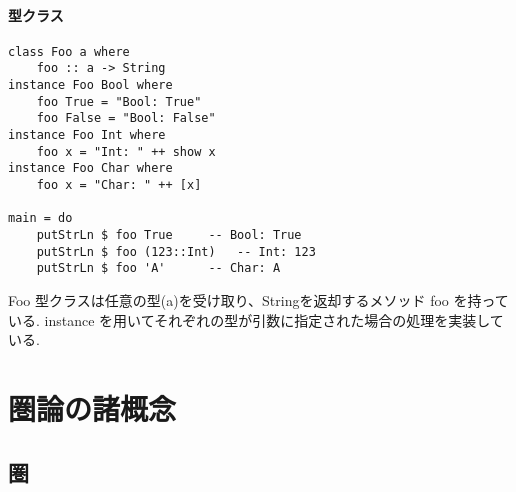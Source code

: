 \documentclass[dvipdfmx]{jsbook}
\theoremstyle{plain}
\begin{document}
\subsection{型クラス}
\begin{lstlisting}
class Foo a where
    foo :: a -> String
instance Foo Bool where
    foo True = "Bool: True"
    foo False = "Bool: False"
instance Foo Int where
    foo x = "Int: " ++ show x
instance Foo Char where
    foo x = "Char: " ++ [x]

main = do
    putStrLn $ foo True		-- Bool: True
    putStrLn $ foo (123::Int)	-- Int: 123
    putStrLn $ foo 'A'		-- Char: A
\end{lstlisting}
Foo 型クラスは任意の型(a)を受け取り、Stringを返却するメソッド foo を持っている. instance を用いてそれぞれの型が引数に指定された場合の処理を実装している.
\part{圏論の諸概念}
\chapter{圏}
\end{document}
